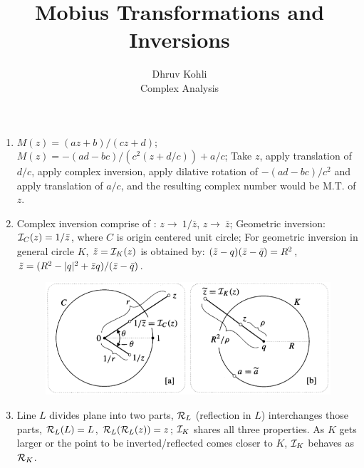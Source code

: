 \documentclass[12pt]{article}
\newcommand{\rto}{\rightarrow\ }
\def\mc{\ensuremath\mathcal}
\def\td{\ensuremath\tilde}
\def\mc{\ensuremath\mathcal}
\def\td{\ensuremath\tilde}
\begin{document}
 
 
\title{Mobius Transformations and Inversions}%
\author{Dhruv Kohli\\ %
Complex Analysis} %
 
\maketitle
\begin{enumerate}
    \item $M(z) = (az+b)/(cz+d)$; $M(z) = -(ad-bc)/(c^2(z+d/c))+a/c$; Take $z$, apply translation of $d/c$, apply complex inversion, apply dilative rotation of $-(ad-bc)/c^2$ and apply translation of $a/c$, and the resulting complex number would be M.T. of $z$.

    \item Complex inversion comprise of : $z \rto 1/\bar{z}$, $z\rto \bar{z}$; Geometric inversion: $\mc{I}_{C}(z) = 1/\bar{z}$, where $C$ is origin centered unit circle; For geometric inversion in general circle $K$, $\td{z}=\mc{I}_K(z)$ is obtained by: $(\td{z}-q)(\bar{z}-\bar{q}) = R^2$, $\td{z} = (R^2-|q|^2+\bar{z}q)/(\bar{z}-\bar{q})$.

    \begin{figure}[h!]
        \centering
        \includegraphics[scale=0.7]{fig_1}
        \label{f1}
    \end{figure}

    \item Line $L$ divides plane into two parts, $\mc{R}_L$ (reflection in $L$) interchanges those parts, $\mc{R}_L(L) = L$, $\mc{R}_L(\mc{R}_L(z)) = z$; $\mc{I}_K$ shares all three properties. As $K$ gets larger or the point to be inverted/reflected comes closer to $K$, $\mc{I}_K$ behaves as $\mc{R}_K$.


\end{enumerate}
\end{document}

